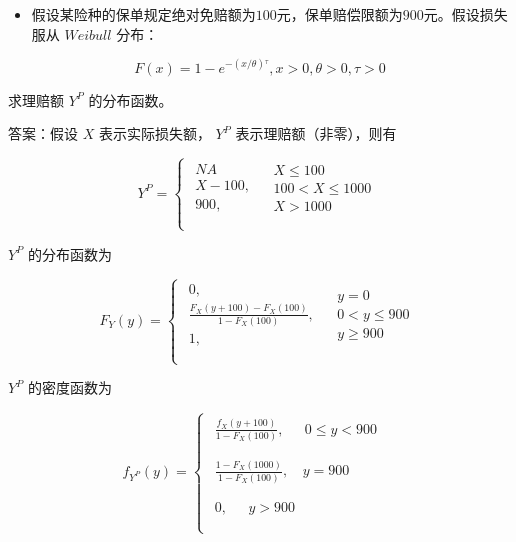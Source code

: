 \documentclass[
]{book}
\providecommand{\tightlist}{%
  \setlength{\itemsep}{0pt}\setlength{\parskip}{0pt}}
\begin{document}
\begin{itemize}
\tightlist
\item
  假设某险种的保单规定绝对免赔额为\(100\)元，保单赔偿限额为\(900\)元。假设损失服从 \(Weibull\) 分布：
\end{itemize}

\[
F(x)=1-{{e}^{- {{{(x/\theta)}}{}^{\tau }}}},x>0,\theta >0,\tau >0
\]

求理赔额 \(Y^P\) 的分布函数。

答案：假设 \(X\) 表示实际损失额， \(Y^P\) 表示理赔额（非零），则有

\[
{{Y}^{P}}=\left\{ \begin{matrix}
   \begin{matrix}
   {NA}  \\
   X-100,  \\
   900,  \\
\end{matrix} & \begin{matrix}
   X\le 100  \\
   100<X\le 1000  \\
   X>1000  \\
\end{matrix}  \\
\end{matrix} \right.
\]

\(Y^P\) 的分布函数为

\[
{{F}_{Y}}(y)=\left\{ \begin{matrix}
   \begin{matrix}
   0,  \\
   \frac{{{F}_{X}}(y+100)-{{F}_{X}}(100)}{1-{{F}_{X}}(100)},  \\
   1,  \\
\end{matrix} & \begin{matrix}
   y=0  \\
   0<y\le 900  \\
   y\ge 900  \\
\end{matrix}  \\
\end{matrix} \right.
\]

\(Y^P\) 的密度函数为

\[
{{f}_{{{Y}^{P}}}}(y)=\left\{ \begin{matrix}
   \begin{matrix}
   \frac{{{f}_{X}}(y+100)}{1-{{F}_{X}}(100)}, & \text{   }0\le y<900  \\
\end{matrix}  \\
   \begin{matrix}
   \frac{1-{{F}_{X}}(1000)}{1-{{F}_{X}}(100)}\text{,  } & y=900  \\
\end{matrix}  \\
   \begin{matrix}
   0,\text{                   } & y>900  \\
\end{matrix}  \\
\end{matrix} \right.\text{        }
\]
\end{document}
